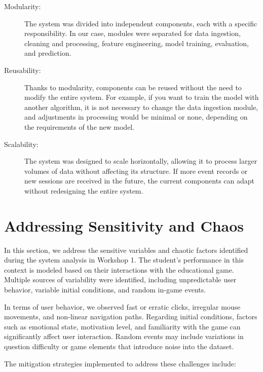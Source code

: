 \documentclass{article}
\begin{document}
\begin{description}
  \item[Modularity:] The system was divided into independent components, each with a specific responsibility. In our case, modules were separated for data ingestion, cleaning and processing, feature engineering, model training, evaluation, and prediction.
  
  \item[Reusability:] Thanks to modularity, components can be reused without the need to modify the entire system. For example, if you want to train the model with another algorithm, it is not necessary to change the data ingestion module, and adjustments in processing would be minimal or none, depending on the requirements of the new model.
  
  \item[Scalability:] The system was designed to scale horizontally, allowing it to process larger volumes of data without affecting its structure. If more event records or new sessions are received in the future, the current components can adapt without redesigning the entire system.
\end{description}

\section{Addressing Sensitivity and Chaos}
In this section, we address the sensitive variables and chaotic factors identified during the system analysis in Workshop 1. The student’s performance in this context is modeled based on their interactions with the educational game. Multiple sources of variability were identified, including unpredictable user behavior, variable initial conditions, and random in-game events.

In terms of user behavior, we observed fast or erratic clicks, irregular mouse movements, and non-linear navigation paths. Regarding initial conditions, factors such as emotional state, motivation level, and familiarity with the game can significantly affect user interaction. Random events may include variations in question difficulty or game elements that introduce noise into the dataset.

The mitigation strategies implemented to address these challenges include:
\end{document}
